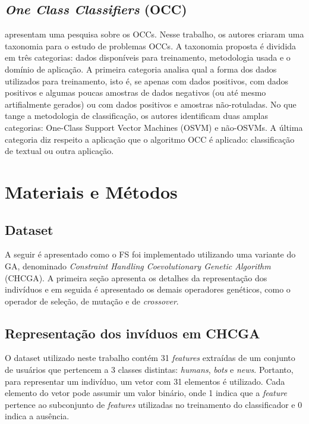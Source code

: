 \documentclass{article}
\begin{document}
\subsection{{\itshape One Class Classifiers} (OCC)}
\citet{Khan2014} apresentam uma pesquisa sobre os OCCs. Nesse trabalho, os
autores criaram uma taxonomia para o estudo de problemas OCCs. A taxonomia
proposta é dividida em três categorias: dados disponíveis para treinamento,
metodologia usada e o domínio de aplicação. A primeira categoria analisa qual a
forma dos dados utilizados para treinamento, isto é, se apenas com dados
positivos, com dados positivos e algumas poucas amostras de dados negativos (ou
até mesmo artifialmente gerados) ou com dados positivos e amostras
não-rotuladas. No que tange a metodologia de classificação, os autores
identificam duas amplas categorias: One-Class Support Vector Machines (OSVM) e
não-OSVMs. A última categoria diz respeito a aplicação que o algoritmo OCC é
aplicado: classificação de textual ou outra aplicação.

\section{Materiais e Métodos} \label{sec_metodo}
\subsection{Dataset}

A seguir é apresentado como o FS foi implementado utilizando uma variante do GA,
denominado \textit{Constraint Handling Coevolutionary Genetic Algorithm}
(CHCGA). A primeira seção apresenta os detalhes da representação dos indivíduos
e em seguida é apresentado os demais operadores genéticos, como o operador de
seleção, de mutação e de \textit{crossover}.

\subsection{Representação dos invíduos em CHCGA}
O dataset utilizado neste trabalho contém 31 \textit{features} extraídas de um
conjunto de usuários que pertencem a 3 classes distintas: \textit{humans},
\textit{bots} e \textit{news}. Portanto, para representar um indivíduo, um vetor
com 31 elementos é utilizado. Cada elemento do vetor pode assumir um valor
binário, onde 1 indica que a \textit{feature} pertence ao subconjunto de
\textit{features} utilizadas no treinamento do classificador e 0 indica a
ausência.
\end{document}
